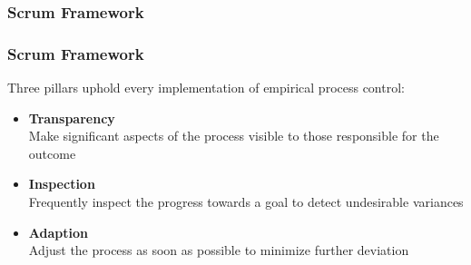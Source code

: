 \begin{frame}
	\frametitle{Scrum Framework}
\end{frame}

\begin{frame}
	\frametitle{Scrum Framework}
	Three pillars uphold every implementation of empirical process control:
	\vspace{1em}
	\begin{itemize}
		\setlength\itemsep{0.7em}
		\item<1-> \textbf{Transparency}\\
		Make significant aspects of the process visible to those responsible for the outcome
		\item<2-> \textbf{Inspection}\\
		Frequently inspect the progress towards a goal to detect undesirable variances
		\item<3-> \textbf{Adaption}\\
		Adjust the process as soon as possible to minimize further deviation
	\end{itemize}
\end{frame}